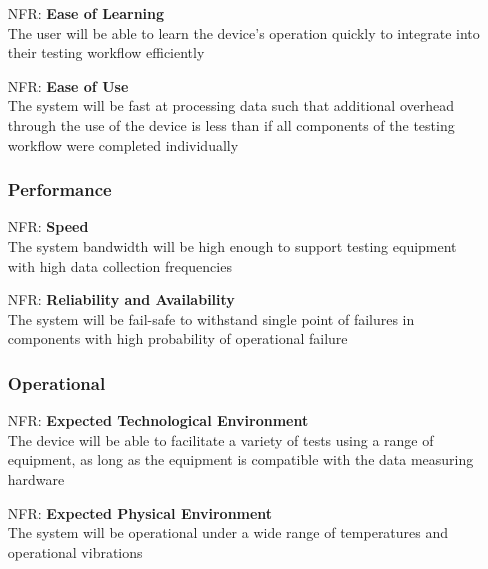 \documentclass[12pt]{article}
\newcounter{nfrnum} %
\begin{document}
\noindent\begin{itemize}

\subsubsection{Usability} 

    \item[NFR\refstepcounter{nfrnum}\thenfrnum:]
    \textbf{Ease of Learning}\\
    The user will be able to learn the device's operation quickly to integrate into their testing workflow efficiently

    \item[NFR\refstepcounter{nfrnum}\thenfrnum:]
    \textbf{Ease of Use}\\
    The system will be fast at processing data such that additional overhead through the use of the device is less than if all components of the testing workflow were completed individually

\subsubsection{Performance} 

    \item[NFR\refstepcounter{nfrnum}\thenfrnum:]
    \textbf{Speed}\\
    The system bandwidth will be high enough to support testing equipment with high data collection frequencies

    \item[NFR\refstepcounter{nfrnum}\thenfrnum:]
    \textbf{Reliability and Availability}\\
    The system will be fail-safe to withstand single point of failures in components with high probability of operational failure

\subsubsection{Operational}

    \item[NFR\refstepcounter{nfrnum}\thenfrnum:]
      \textbf{Expected Technological Environment}\\
    The device will be able to facilitate a variety of tests using a range of equipment, as long as the equipment is compatible with the data measuring hardware

    \item[NFR\refstepcounter{nfrnum}\thenfrnum:]
    \textbf{Expected Physical Environment}\\
    The system will be operational under a wide range of temperatures and operational vibrations


\end{itemize}
\end{document}
